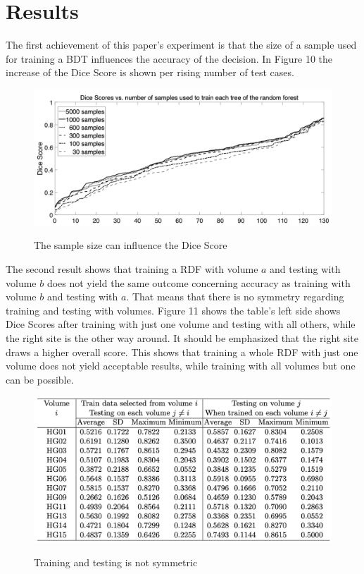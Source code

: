\documentclass[
12pt,
headsepline,
bibliography=totoc,
twoside=semi,
fleqn
]{scrartcl}
\begin{document}
 \newpage
\section{Results\label{sec:sec4}}

 The first achievement of this paper's experiment is that the size of a sample used for training a BDT influences the accuracy of the decision. In Figure 10 the increase of the Dice Score is shown per rising number of test cases.
 
 \begin{figure}[H]
 \centering \includegraphics[scale=0.7]{BDT16.png}\label{fig:test}
 \caption{The sample size can influence the Dice Score}
 \end{figure} 

 The second result shows that training a RDF with volume $a$ and testing with volume $b$ does not yield the same outcome concerning accuracy as training with volume $b$ and testing with $a$. That means that there is no symmetry regarding training and testing with volumes. Figure 11 shows the table's left side shows Dice Scores after training with just one volume and testing with all others, while the right site is the other way around. It should be emphasized that the right site draws a higher overall score. This shows that training a whole RDF with just one volume does not yield acceptable results, while training with all volumes but one can be possible. 

 \begin{figure}[H]
 \centering \includegraphics[scale=0.7]{BDT17.png}\label{fig:fig17}
 \caption{Training and testing is not symmetric}
 \end{figure} 
\end{document}
